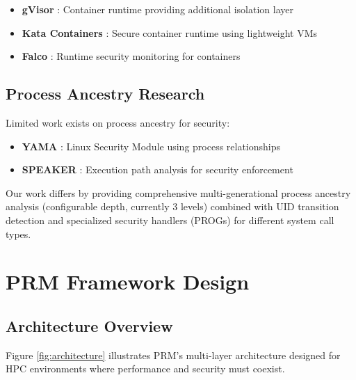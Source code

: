 \documentclass[conference]{IEEEtran}
\begin{document}
\begin{itemize}
\item \textbf{gVisor} \cite{google2018gvisor}: Container runtime providing additional isolation layer
\item \textbf{Kata Containers} \cite{kata2018architecture}: Secure container runtime using lightweight VMs
\item \textbf{Falco} \cite{falco2016runtime}: Runtime security monitoring for containers
\end{itemize}

\subsection{Process Ancestry Research}
Limited work exists on process ancestry for security:

\begin{itemize}
\item \textbf{YAMA} \cite{cook2012yama}: Linux Security Module using process relationships
\item \textbf{SPEAKER} \cite{li2018speaker}: Execution path analysis for security enforcement
\end{itemize}

Our work differs by providing comprehensive multi\mbox{-}generational process ancestry analysis (configurable depth, currently 3 levels) combined with UID transition detection and specialized security handlers (PROGs) for different system call types.

\section{PRM Framework Design}
\label{sec:design}

\subsection{Architecture Overview}
Figure \ref{fig:architecture} illustrates PRM's multi-layer architecture designed for HPC environments where performance and security must coexist.
\end{document}
